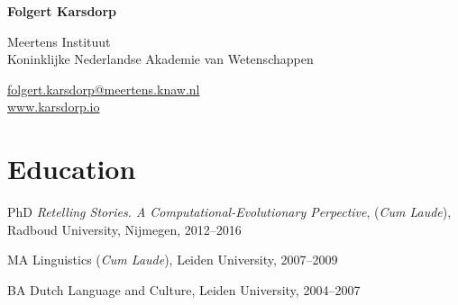 \documentclass[12pt,letterpaper]{report}
\newcommand{\myname}{Folgert Karsdorp}
\newcommand{\namefont}[1]{{\normalfont\bfseries\Huge{#1}}}
\begin{document}
    \raggedright{}

    \namefont{\myname}

    \vspace{1em}
    \begin{minipage}[t]{0.600\textwidth}
        Meertens Instituut \\
        Koninklijke Nederlandse Akademie van Wetenschappen
    \end{minipage}
    \begin{minipage}[t]{0.390\textwidth}
        \flushright{}
        \href{mailto:folgert.karsdorp@meertens.knaw.nl}{folgert.karsdorp@meertens.knaw.nl} \\
        \href{https://www.karsdorp.io}{www.karsdorp.io}
    \end{minipage}

\section*{Education}
\begin{tablist}
\item[PhD] \tab{}\textit{Retelling Stories. A Computational-Evolutionary Perpective},
  (\textit{Cum Laude}), Radboud University, Nijmegen, 2012--2016
  \item[MA] \tab{}Linguistics (\textit{Cum Laude}), Leiden University, 2007--2009
  \item[BA]  \tab{}Dutch Language and Culture, Leiden University, 2004--2007
\end{tablist}
\end{document}
